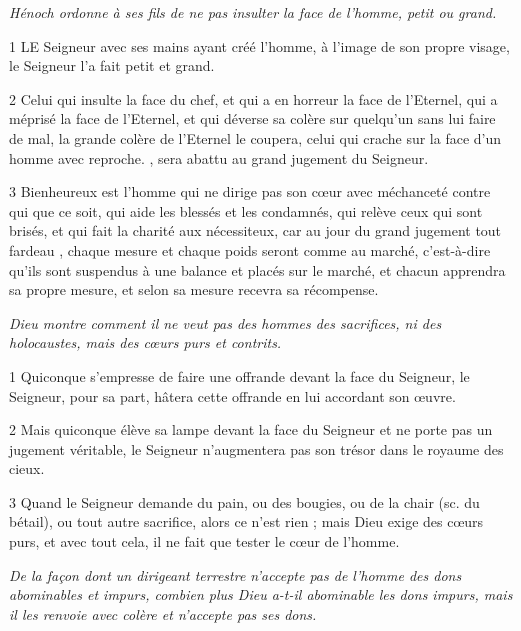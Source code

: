 
\par \textit{Hénoch ordonne à ses fils de ne pas insulter la face de l'homme, petit ou grand.}

\par 1 LE Seigneur avec ses mains ayant créé l'homme, à l'image de son propre visage, le Seigneur l'a fait petit et grand.

\par 2 Celui qui insulte la face du chef, et qui a en horreur la face de l'Eternel, qui a méprisé la face de l'Eternel, et qui déverse sa colère sur quelqu'un sans lui faire de mal, la grande colère de l'Eternel le coupera, celui qui crache sur la face d'un homme avec reproche. , sera abattu au grand jugement du Seigneur.

\par 3 Bienheureux est l'homme qui ne dirige pas son cœur avec méchanceté contre qui que ce soit, qui aide les blessés et les condamnés, qui relève ceux qui sont brisés, et qui fait la charité aux nécessiteux, car au jour du grand jugement tout fardeau , chaque mesure et chaque poids seront comme au marché, c'est-à-dire qu'ils sont suspendus à une balance et placés sur le marché, et chacun apprendra sa propre mesure, et selon sa mesure recevra sa récompense.




\par \textit{Dieu montre comment il ne veut pas des hommes des sacrifices, ni des holocaustes, mais des cœurs purs et contrits.}

\par 1 Quiconque s'empresse de faire une offrande devant la face du Seigneur, le Seigneur, pour sa part, hâtera cette offrande en lui accordant son œuvre.

\par 2 Mais quiconque élève sa lampe devant la face du Seigneur et ne porte pas un jugement véritable, le Seigneur n'augmentera pas son trésor dans le royaume des cieux.

\par 3 Quand le Seigneur demande du pain, ou des bougies, ou de la chair (sc. du bétail), ou tout autre sacrifice, alors ce n'est rien ; mais Dieu exige des cœurs purs, et avec tout cela, il ne fait que tester le cœur de l'homme.


\par \textit{De la façon dont un dirigeant terrestre n'accepte pas de l'homme des dons abominables et impurs, combien plus Dieu a-t-il abominable les dons impurs, mais il les renvoie avec colère et n'accepte pas ses dons.}

